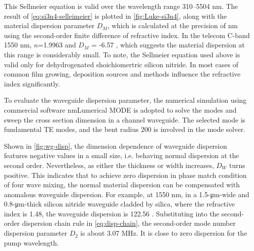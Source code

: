 This Sellmeier equation is valid over the wavelength range 310–5504 \si{\nm}.
The result of \autoref{eq:si3n4-selleimeier} is plotted in \autoref{fig:Luke-si3n4}, along with the material dispersion parameter $D_M$, which is calculated at the precision of \si{\nm} using the second-order finite difference of refractive index. In the telecom C-band 1550 nm, $n$=1.9963 and $D_M$ = -6.57 \dispu, which suggests the material dispersion at this range is considerably small. To note, the Sellmeier equation used above is valid only for dehydrogenated shoichiomertric silicon nitride. In most cases of common film growing, deposition sources and methods influence the refractive index significantly.

\begin{figure}
    \centering
    
    \label{fig:Luke-si3n4}
\end{figure}
To evaluate the waveguide dispersion parameter, the numerical simulation using commercial software \si{\nm}{Lumerical MODE} is adopted to solve the modes and sweep the cross section dimension in a channel waveguide. The selected mode is fundamental TE modes, and the bent radius 200 \um is involved in the mode solver.

Shown in \autoref{fig:wg-disp}, the dimension dependence of waveguide dispersion features negative values in a small size, i.e. behaving normal dispersion at the second order. Nevertheless, as either the thickness or width increases,
$D_W$ turns positive. This indicates that to achieve zero dispersion in phase match condition of four wave mixing, the normal material dispersion can be compensated with anomalous waveguide dispersion. 
For example, at 1550 \si{\nm}, in a 1.5-\si{\um}-wide and 0.8-\si{\um}-thick silicon nitride waveguide cladded by silica, where the refractive index is 1.48,
the waveguide dispersion is 122.56 \dispu. Substituting into the second-order dispersion chain rule in \autoref{eq:disp-chain}, the second-order mode number dispersion parameter $ D_2 $ is about 3.07 MHz. It is close to zero dispersion for the pump wavelength.

\begin{figure}
	\centering
	
	\label{fig:wg-disp}
\end{figure}

